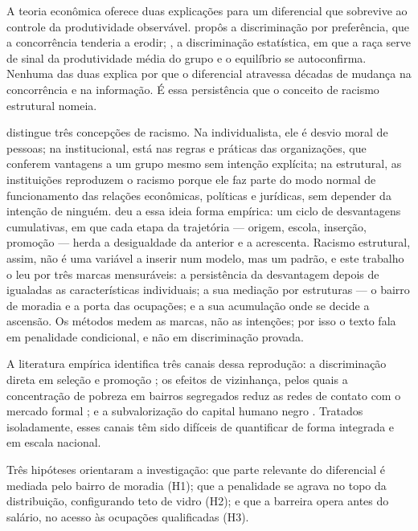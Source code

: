\documentclass[11pt, a4paper, oneside]{article}
\begin{document}
A teoria econômica oferece duas explicações para um diferencial que sobrevive ao
controle da produtividade observável.  propôs a
discriminação por preferência, que a concorrência tenderia a erodir;
, a discriminação estatística, em que a raça serve de sinal
da produtividade média do grupo e o equilíbrio se autoconfirma. Nenhuma das duas
explica por que o diferencial atravessa décadas de mudança na concorrência e na
informação. É essa persistência que o conceito de racismo estrutural nomeia.

 distingue três concepções de racismo. Na individualista,
ele é desvio moral de pessoas; na institucional, está nas regras e práticas das
organizações, que conferem vantagens a um grupo mesmo sem intenção explícita; na
estrutural, as instituições reproduzem o racismo porque ele faz parte do modo
normal de funcionamento das relações econômicas, políticas e jurídicas, sem
depender da intenção de ninguém.  deu a essa ideia forma
empírica: um ciclo de desvantagens cumulativas, em que cada etapa da trajetória ---
origem, escola, inserção, promoção --- herda a desigualdade da anterior e a acrescenta.
Racismo estrutural, assim, não é uma variável a inserir num modelo, mas um padrão, e
este trabalho o leu por três marcas mensuráveis: a persistência da desvantagem depois
de igualadas as características individuais; a sua mediação por estruturas --- o
bairro de moradia e a porta das ocupações; e a sua acumulação onde se decide a
ascensão. Os métodos medem as marcas, não as intenções; por isso o texto fala em
penalidade condicional, e não em discriminação provada.

A literatura empírica identifica três canais dessa reprodução: a discriminação
direta em seleção e promoção \cite{pager2007}; os efeitos de vizinhança, pelos quais
a concentração de pobreza em bairros segregados reduz as redes de contato com o
mercado formal \cite{wilson1987, sampson1997, marques2010}; e a subvalorização do
capital humano negro \cite{henriques2001, soares2009}. Tratados isoladamente, esses
canais têm sido difíceis de quantificar de forma integrada e em escala nacional.

Três hipóteses orientaram a investigação: que parte relevante do diferencial é
mediada pelo bairro de moradia (H1); que a penalidade se agrava no topo da
distribuição, configurando teto de vidro (H2); e que a barreira opera antes do
salário, no acesso às ocupações qualificadas (H3).
\end{document}
